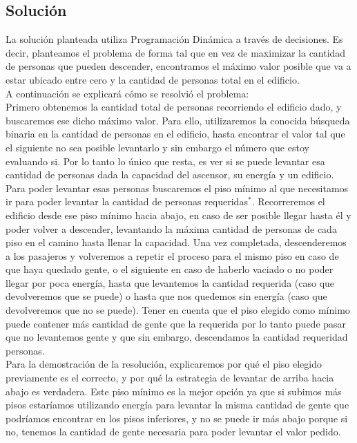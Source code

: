 \subsection{Soluci\'on}
La solución planteada utiliza Programación Dinámica a través de decisiones. Es decir, planteamos el problema de forma tal que en vez de maximizar la cantidad de personas que 
pueden descender, encontramos el máximo valor posible que va a estar ubicado entre cero y la cantidad de personas total en el edificio.\\
A continuación se explicará cómo se resolvió el problema:\\
Primero obtenemos la cantidad total de personas recorriendo el edificio dado, y buscaremos ese dicho máximo valor.
Para ello, utilizaremos la conocida búsqueda binaria en la cantidad de personas en el edificio, hasta encontrar el valor tal que el siguiente no sea posible levantarlo y sin embargo el número que estoy evaluando si.
Por lo tanto lo único que resta, es ver si se puede levantar esa cantidad de personas dada la capacidad del ascensor, su energía y un edificio. \\
Para poder levantar esas personas buscaremos el piso mínimo al que necesitamos ir para poder levantar la cantidad de personas requeridas$^*$. Recorreremos el edificio desde ese piso mínimo hacia abajo, en caso de
ser posible llegar hasta él y poder volver a descender, levantando la máxima cantidad de personas de cada piso en el camino hasta llenar la capacidad. Una vez completada, descenderemos a los pasajeros y volveremos a repetir el proceso
para el mismo piso en caso de que haya quedado gente, o el siguiente en caso de haberlo vaciado o no poder llegar por poca energía, hasta que levantemos la cantidad requerida (caso que devolveremos que se puede) o hasta que nos quedemos sin energía (caso que devolveremos que no se puede). Tener en cuenta que el piso elegido como mínimo puede contener más cantidad de gente que la requerida por lo tanto puede pasar que no levantemos gente y que sin embargo, descendamos la cantidad requeridad personas.\\
Para la demostración de la resolución, explicaremos por qué el piso elegido previamente es el correcto, y por qué la estrategia de levantar de arriba hacia abajo es verdadera.
Este piso mínimo es la mejor opción ya que si subimos más pisos estaríamos utilizando energía para levantar la misma cantidad de gente que podríamos encontrar en los pisos
inferiores, y no se puede ir más abajo porque si no, tenemos la cantidad de gente necesaria para poder levantar el valor pedido.\\

